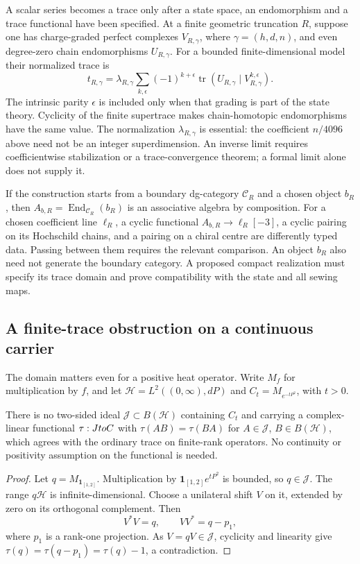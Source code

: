 A scalar series becomes a trace only after a state space, an
endomorphism and a trace functional have been specified.  At a
finite geometric truncation \(R\), suppose one has charge-graded
perfect complexes \(V_{R,\gamma}\), where \(\gamma=(h,d,n)\),
and even degree-zero chain endomorphisms \(U_{R,\gamma}\).
For a bounded finite-dimensional model their normalized trace is
\[
 t_{R,\gamma}=\lambda_{R,\gamma}
       \sum_{k,\epsilon}(-1)^{k+\epsilon}
       \operatorname{tr}
       (U_{R,\gamma}\mid V_{R,\gamma}^{k,\epsilon}).
\]
The intrinsic parity \(\epsilon\) is included only when that
grading is part of the state theory.  Cyclicity of the finite
supertrace makes chain-homotopic endomorphisms have the same value.
The normalization \(\lambda_{R,\gamma}\) is essential: the
coefficient \(n/4096\) above need not be an integer superdimension.
An inverse limit requires coefficientwise stabilization or a
trace-convergence theorem; a formal limit alone does not supply it.

If the construction starts from a boundary dg-category
\(\mathcal C_R\) and a chosen object \(b_R\), then
\(A_{b,R}=\operatorname{End}_{\mathcal C_R}(b_R)\) is an
associative algebra by composition.  For a chosen coefficient
line \(\ell_R\), a cyclic functional
\(A_{b,R}\to\ell_R[-3]\), a cyclic pairing on its Hochschild
chains, and a pairing on a chiral centre are differently typed
data.  Passing between them requires the relevant comparison.
An object \(b_R\) also need not generate the boundary category.
A proposed compact realization must specify its trace domain
and prove compatibility with the state and all sewing maps.

\subsection{A finite-trace obstruction on a continuous carrier}

The domain matters even for a positive heat operator.  Write
\(M_f\) for multiplication by \(f\), and let
\(\mathcal H=L^2((0,\infty),dP)\) and
\(C_t=M_{e^{-tP^2}}\), with \(t>0\).

\begin{proposition}\label{prop:zbps-no-full-cyclic-extension}
There is no two-sided ideal \(\mathcal J\subset B(\mathcal H)\)
containing \(C_t\) and carrying a complex-linear functional
\(\tau:JtoC\) with
\(\tau(AB)=\tau(BA)\) for \(A\in\mathcal J\),
\(B\in B(\mathcal H)\), which agrees with the ordinary trace
on finite-rank operators.
No continuity or positivity assumption on the functional is
needed.
\end{proposition}
\begin{proof}
Let \(q=M_{\mathbf1_{[1,2]}}\).  Multiplication by
\(\mathbf1_{[1,2]}e^{tP^2}\) is bounded, so \(q\in\mathcal J\).
The range \(q\mathcal H\) is infinite-dimensional.  Choose a
unilateral shift \(V\) on it, extended by zero on its orthogonal
complement.  Then
\[
 V^*V=q,\qquad VV^*=q-p_1,
\]
where \(p_1\) is a rank-one projection.  As
\(V=qV\in\mathcal J\), cyclicity and linearity give
\(\tau(q)=\tau(q-p_1)=\tau(q)-1\), a contradiction.
\end{proof}

